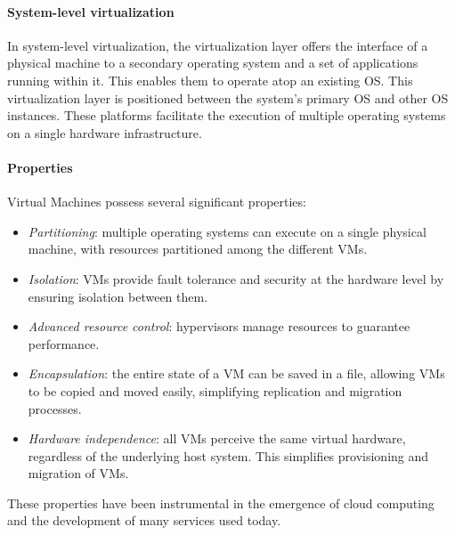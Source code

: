 \paragraph*{System-level virtualization}
In system-level virtualization, the virtualization layer offers the interface of a physical machine to a secondary operating system and a set of applications running within it. 
This enables them to operate atop an existing OS. 
This virtualization layer is positioned between the system's primary OS and other OS instances.
These platforms facilitate the execution of multiple operating systems on a single hardware infrastructure.

\paragraph*{Properties}
Virtual Machines possess several significant properties:
\begin{itemize}
    \item \textit{Partitioning}: multiple operating systems can execute on a single physical machine, with resources partitioned among the different VMs.
    \item \textit{Isolation}: VMs provide fault tolerance and security at the hardware level by ensuring isolation between them.
    \item \textit{Advanced resource control}: hypervisors manage resources to guarantee performance.
    \item \textit{Encapsulation}: the entire state of a VM can be saved in a file, allowing VMs to be copied and moved easily, simplifying replication and migration processes.
    \item \textit{Hardware independence}: all VMs perceive the same virtual hardware, regardless of the underlying host system. 
        This simplifies provisioning and migration of VMs.
\end{itemize}
These properties have been instrumental in the emergence of cloud computing and the development of many services used today.

